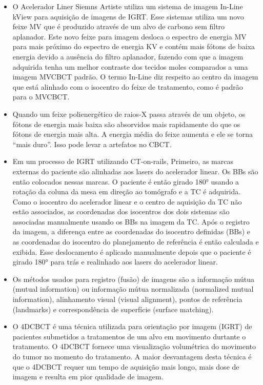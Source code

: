 \documentclass[11pt,a4paper]{article}
\newcounter{exemplo}
\begin{document}
\begin{exemplo}[IGRT]
\begin{itemize}
        \item O Acelerador Liner Siemns Artiste utiliza um sistema de imagem In-Line kView para aquisição de imagens de IGRT. Esse sistemas utiliza um novo feixe MV que é produzido através de um alvo de carbono sem filtro aplanador. Este novo feixe para imagem desloca o espectro de energia MV para mais próximo do espectro de energia KV e contém mais fótons de baixa energia devido a ausência do filtro aplanador, fazendo com que a imagem adquirida tenha um melhor contraste dos tecidos moles comparados a uma imagem MVCBCT padrão. O termo In-Line diz respeito ao centro da imagem que está alinhado com o isocentro do feixe de tratamento, como é padrão para o MVCBCT.
        
        \item Quando um feixe polienergético de raios-X passa através de um objeto, os fótons de energia mais baixa são absorvidos mais rapidamente do que os fótons de energia mais alta. A energia média do feixe aumenta e ele se torna “mais duro”. Isso pode levar a artefatos no CBCT.
        
        \item Em um processo de IGRT utilizando CT-on-rails, Primeiro, as marcas externas do paciente são alinhadas aos lasers do acelerador linear. Os BBs são então colocados nessas marcas. O paciente é então girado 180° usando a rotação da coluna da mesa em direção ao tomógrafo e a TC é adquirida. Como o isocentro do acelerador linear e o centro de aquisição da TC não estão associados, as coordenadas dos isocentros dos dois sistemas são associadas manualmente usando os BBs na imagem da TC. Após o registro da imagem, a diferença entre as coordenadas do isocentro definidas (BBs) e as coordenadas do isocentro do planejamento de referência é então calculada e exibida. Esse deslocamento é aplicado manualmente depois que o paciente é girado 180° para trás e realinhado aos lasers do acelerador linear.
        
        \item Os métodos usados para registro (fusão) de imagens são a informação mútua (mutual information) ou informação mútua normalizada (normalized mutual information), alinhamento visual (visual alignment), pontos de referência (landmarks) e correspondência de superfície (surface matching).
        
        \item O 4DCBCT é uma técnica utilizada para orientação por imagem (IGRT) de pacientes submetidos a tratamentos de um alvo em movimento durtante o tratamento. O 4DCBCT fornece uma visualização volumétrica do movimento do tumor no momento do tratamento. A maior desvantagem desta técnica é que o 4DCBCT requer um tempo de aquisição mais longo, mais dose de imagem e resulta em pior qualidade de imagem.
        

\end{itemize}
\end{exemplo}
\end{document}
